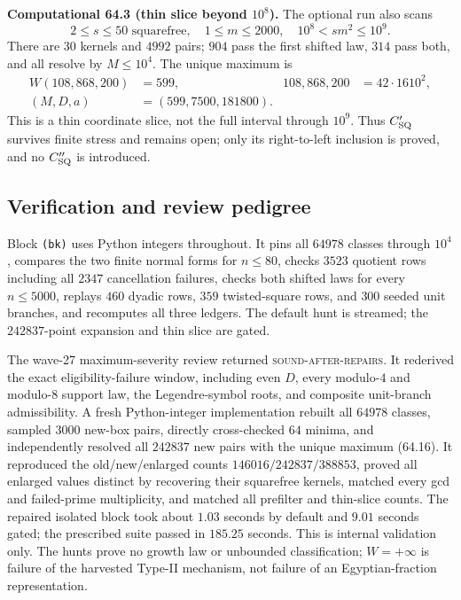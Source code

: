 \documentclass[10pt,reqno]{amsart}
\theoremstyle{definition}
\newcommand{\1}{\mathbf 1}
\begin{document}
\medskip\noindent\textbf{Computational 64.3 (thin slice beyond $10^8$).}
The optional run also scans
\begin{equation}\tag{64.17}
 2\leq s\leq50\text{ squarefree},\quad1\leq m\leq2000,
 \quad10^8<sm^2\leq10^9.
\end{equation}
There are $30$ kernels and $4992$ pairs; $904$ pass the first shifted law,
$314$ pass both, and all resolve by $M\leq10^4$.  The unique maximum is
\begin{equation}\tag{64.18}
 \begin{aligned}
 W(108{,}868{,}200)&=599,&
 108{,}868{,}200&=42\cdot1610^2,\\
 (M,D,a)&=(599,7500,181800).&&
 \end{aligned}
\end{equation}
This is a thin coordinate slice, not the full interval through $10^9$.
Thus $C_{\rm SQ}'$ survives finite stress and remains open; only its
right-to-left inclusion is proved, and no $C_{\rm SQ}''$ is introduced.

\subsection{Verification and review pedigree}
Block \texttt{(bk)} uses Python integers throughout.  It pins all $64978$
classes through $10^4$, compares the two finite normal forms for $n\leq80$,
checks $3523$ quotient rows including all $2347$ cancellation failures,
checks both shifted laws for every $n\leq5000$, replays $460$ dyadic rows,
$359$ twisted-square rows, and $300$ seeded unit branches, and recomputes all
three ledgers.  The default hunt is streamed; the $242837$-point expansion
and thin slice are gated.

The wave-27 maximum-severity review returned
\textsc{sound-after-repairs}.  It rederived the exact eligibility-failure
window, including even $D$, every modulo-$4$ and modulo-$8$ support law, the
Legendre-symbol roots, and composite unit-branch admissibility.  A fresh
Python-integer implementation rebuilt all $64978$ classes, sampled $3000$
new-box pairs, directly cross-checked $64$ minima, and independently resolved
all $242837$ new pairs with the unique maximum (64.16).  It reproduced the
old/new/enlarged counts $146016/242837/388853$, proved all enlarged values
distinct by recovering their squarefree kernels, matched every gcd and
failed-prime multiplicity, and matched all prefilter and thin-slice counts.
The repaired isolated block took about $1.03$ seconds by default and $9.01$
seconds gated; the prescribed suite passed in $185.25$ seconds.  This is
internal validation only.  The hunts prove no growth law or unbounded
classification; $W=+\infty$ is failure of the harvested Type-II mechanism,
not failure of an Egyptian-fraction representation.
\end{document}
